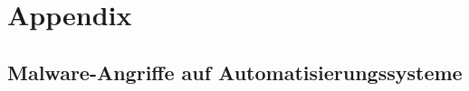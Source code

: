 \appendix

\section{Appendix}
%
\subsection{Malware-Angriffe auf Automatisierungssysteme}\label{sec:A_Malware_Tabelle}


